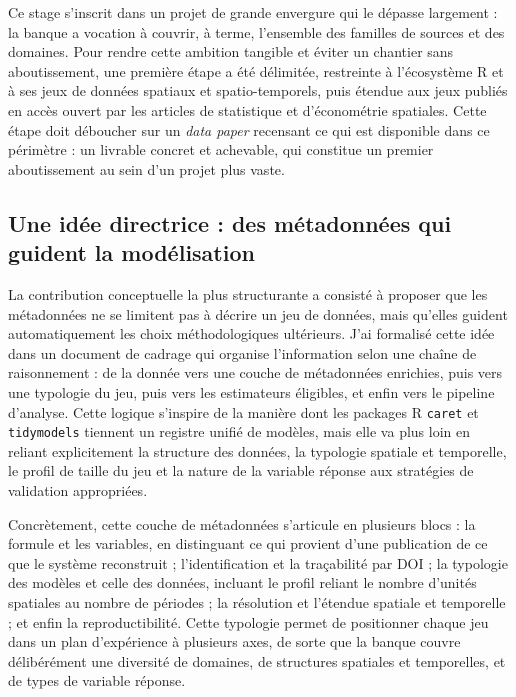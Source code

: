 \documentclass[11pt,a4paper]{article}
\begin{document}
Ce stage s'inscrit dans un projet de grande envergure qui le dépasse largement : la banque a vocation à couvrir, à terme, l'ensemble des familles de sources et des domaines. Pour rendre cette ambition tangible et éviter un chantier sans aboutissement, une première étape a été délimitée, restreinte à l'écosystème R et à ses jeux de données spatiaux et spatio-temporels, puis étendue aux jeux publiés en accès ouvert par les articles de statistique et d'économétrie spatiales. Cette étape doit déboucher sur un \textit{data paper} recensant ce qui est disponible dans ce périmètre : un livrable concret et achevable, qui constitue un premier aboutissement au sein d'un projet plus vaste.

\subsection{Une idée directrice : des métadonnées qui guident la modélisation}

La contribution conceptuelle la plus structurante a consisté à proposer que les métadonnées ne se limitent pas à décrire un jeu de données, mais qu'elles guident automatiquement les choix méthodologiques ultérieurs. J'ai formalisé cette idée dans un document de cadrage qui organise l'information selon une chaîne de raisonnement : de la donnée vers une couche de métadonnées enrichies, puis vers une typologie du jeu, puis vers les estimateurs éligibles, et enfin vers le pipeline d'analyse. Cette logique s'inspire de la manière dont les packages R \texttt{caret} et \texttt{tidymodels} tiennent un registre unifié de modèles, mais elle va plus loin en reliant explicitement la structure des données, la typologie spatiale et temporelle, le profil de taille du jeu et la nature de la variable réponse aux stratégies de validation appropriées.

Concrètement, cette couche de métadonnées s'articule en plusieurs blocs : la formule et les variables, en distinguant ce qui provient d'une publication de ce que le système reconstruit ; l'identification et la traçabilité par DOI ; la typologie des modèles et celle des données, incluant le profil reliant le nombre d'unités spatiales au nombre de périodes ; la résolution et l'étendue spatiale et temporelle ; et enfin la reproductibilité. Cette typologie permet de positionner chaque jeu dans un plan d'expérience à plusieurs axes, de sorte que la banque couvre délibérément une diversité de domaines, de structures spatiales et temporelles, et de types de variable réponse.
\end{document}
